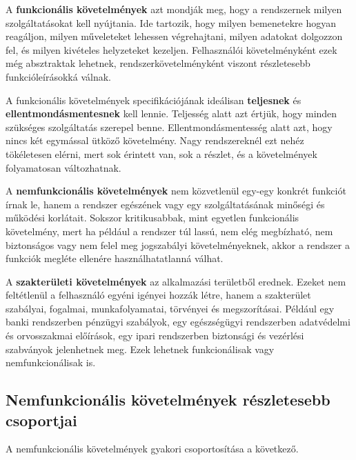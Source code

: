 \begin{center}

\end{center}

A \textbf{funkcionális követelmények} azt mondják meg, hogy a rendszernek milyen szolgáltatásokat kell nyújtania. Ide tartozik, hogy milyen bemenetekre hogyan reagáljon, milyen műveleteket lehessen végrehajtani, milyen adatokat dolgozzon fel, és milyen kivételes helyzeteket kezeljen. Felhasználói követelményként ezek még absztraktak lehetnek, rendszerkövetelményként viszont részletesebb funkcióleírásokká válnak.

A funkcionális követelmények specifikációjának ideálisan \textbf{teljesnek} és \textbf{ellentmondásmentesnek} kell lennie. Teljesség alatt azt értjük, hogy minden szükséges szolgáltatás szerepel benne. Ellentmondásmentesség alatt azt, hogy nincs két egymással ütköző követelmény. Nagy rendszereknél ezt nehéz tökéletesen elérni, mert sok érintett van, sok a részlet, és a követelmények folyamatosan változhatnak.

A \textbf{nemfunkcionális követelmények} nem közvetlenül egy-egy konkrét funkciót írnak le, hanem a rendszer egészének vagy egy szolgáltatásának minőségi és működési korlátait. Sokszor kritikusabbak, mint egyetlen funkcionális követelmény, mert ha például a rendszer túl lassú, nem elég megbízható, nem biztonságos vagy nem felel meg jogszabályi követelményeknek, akkor a rendszer a funkciók megléte ellenére használhatatlanná válhat.

A \textbf{szakterületi követelmények} az alkalmazási területből erednek. Ezeket nem feltétlenül a felhasználó egyéni igényei hozzák létre, hanem a szakterület szabályai, fogalmai, munkafolyamatai, törvényei és megszorításai. Például egy banki rendszerben pénzügyi szabályok, egy egészségügyi rendszerben adatvédelmi és orvosszakmai előírások, egy ipari rendszerben biztonsági és vezérlési szabványok jelenhetnek meg. Ezek lehetnek funkcionálisak vagy nemfunkcionálisak is.

\subsection{Nemfunkcionális követelmények részletesebb csoportjai}

A nemfunkcionális követelmények gyakori csoportosítása a következő.

\begin{center}

\end{center}

